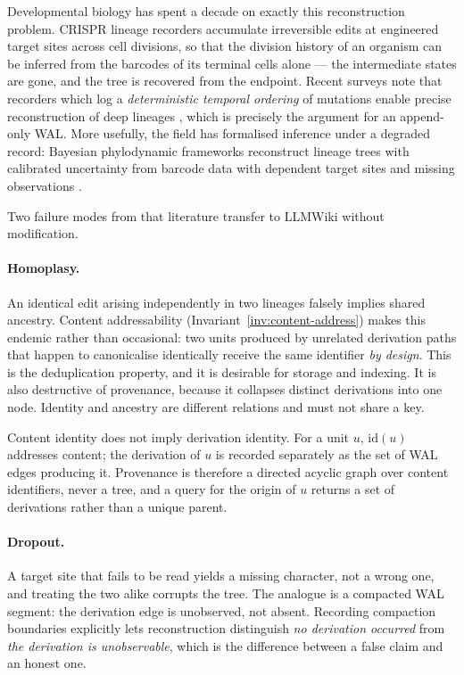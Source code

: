 Developmental biology has spent a decade on exactly this reconstruction problem. CRISPR lineage recorders accumulate irreversible edits at engineered target sites across cell divisions, so that the division history of an organism can be inferred from the barcodes of its terminal cells alone --- the intermediate states are gone, and the tree is recovered from the endpoint. Recent surveys note that recorders which log a \emph{deterministic temporal ordering} of mutations enable precise reconstruction of deep lineages \citep{lineagetracing2026}, which is precisely the argument for an append-only WAL. More usefully, the field has formalised inference under a degraded record: Bayesian phylodynamic frameworks reconstruct lineage trees with calibrated uncertainty from barcode data with dependent target sites and missing observations \citep{phylodynamic2025}.

Two failure modes from that literature transfer to LLMWiki without modification.

\paragraph{Homoplasy.} An identical edit arising independently in two lineages falsely implies shared ancestry. Content addressability (Invariant~\ref{inv:content-address}) makes this endemic rather than occasional: two units produced by unrelated derivation paths that happen to canonicalise identically receive the same identifier \emph{by design}. This is the deduplication property, and it is desirable for storage and indexing. It is also destructive of provenance, because it collapses distinct derivations into one node. Identity and ancestry are different relations and must not share a key.

\begin{invariant}
\label{inv:lineage-distinct}
Content identity does not imply derivation identity. For a unit $u$, $\text{id}(u)$ addresses content; the derivation of $u$ is recorded separately as the set of WAL edges producing it. Provenance is therefore a directed acyclic graph over content identifiers, never a tree, and a query for the origin of $u$ returns a set of derivations rather than a unique parent.
\end{invariant}

\paragraph{Dropout.} A target site that fails to be read yields a missing character, not a wrong one, and treating the two alike corrupts the tree. The analogue is a compacted WAL segment: the derivation edge is unobserved, not absent. Recording compaction boundaries explicitly lets reconstruction distinguish \emph{no derivation occurred} from \emph{the derivation is unobservable}, which is the difference between a false claim and an honest one.

